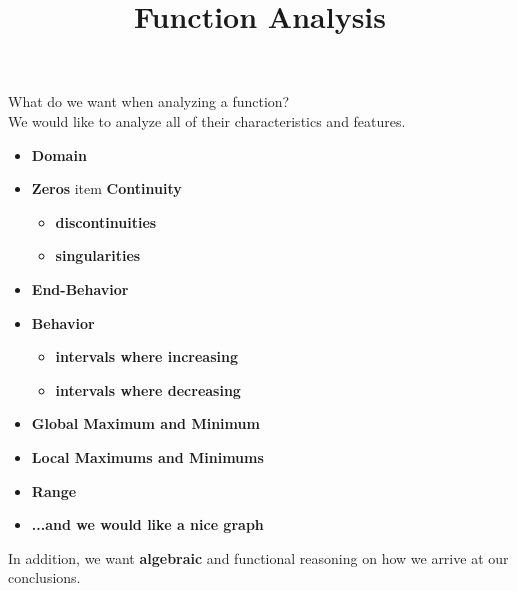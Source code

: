 \documentclass{ximera}
\title{Function Analysis}
\begin{document}
\begin{abstract}
%
\end{abstract}
\maketitle






What do we want when analyzing a function? \\




We would like to analyze all of their characteristics and features. \\



\begin{itemize}
\item \textbf{\textcolor{red!80!black}{Domain}} 
\item \textbf{\textcolor{red!80!black}{Zeros}} 
item \textbf{\textcolor{red!80!black}{Continuity}} 
  \begin{itemize}
     \item \textbf{\textcolor{purple!85!blue}{discontinuities}} 
     \item \textbf{\textcolor{purple!85!blue}{singularities}} 
  \end{itemize}
\item \textbf{\textcolor{red!80!black}{End-Behavior}} 
\item \textbf{\textcolor{red!80!black}{Behavior}} 
  \begin{itemize}
     \item \textbf{\textcolor{purple!85!blue}{intervals where increasing}} 
     \item \textbf{\textcolor{purple!85!blue}{intervals where decreasing}} 
  \end{itemize}
\item \textbf{\textcolor{red!80!black}{Global Maximum and Minimum}} 
\item \textbf{\textcolor{red!80!black}{Local Maximums and Minimums}} 
\item \textbf{\textcolor{red!80!black}{Range}} 
\item \textbf{\textcolor{blue!55!black}{...and we would like a nice graph}} 
\end{itemize}







In addition, we want \textbf{\textcolor{red!80!black}{algebraic}} and functional reasoning on how we arrive at our conclusions.
\end{document}
